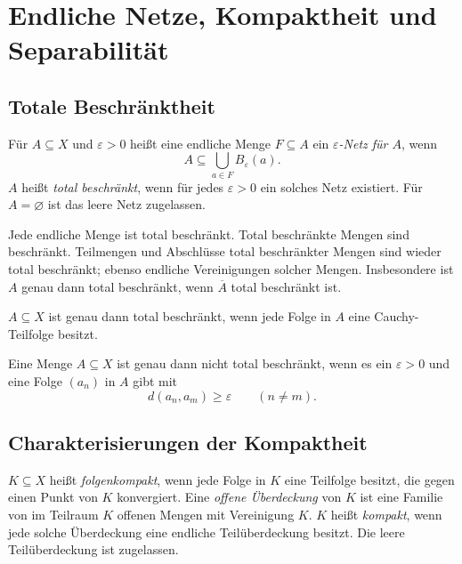 \chapter{Endliche Netze, Kompaktheit und Separabilität}
\label{b47guide:ch:compactness}

\section{Totale Beschränktheit}

\begin{definition}
\label{b47guide:def:totally-bounded}
Für $A\subseteq X$ und $\varepsilon>0$ heißt eine endliche Menge
$F\subseteq A$ ein \emph{$\varepsilon$-Netz für $A$}, wenn
\[
 A\subseteq\bigcup_{a\in F}B_\varepsilon(a).
\]
$A$ heißt \emph{total beschränkt}, wenn für jedes $\varepsilon>0$ ein
solches Netz existiert. Für $A=\varnothing$ ist das leere Netz zugelassen.
\end{definition}

\begin{theorem}
Jede endliche Menge ist total beschränkt. Total beschränkte Mengen sind
beschränkt. Teilmengen und Abschlüsse total beschränkter Mengen sind
wieder total beschränkt; ebenso endliche Vereinigungen solcher Mengen.
Insbesondere ist $A$ genau dann total beschränkt, wenn $\overline A$
total beschränkt ist.
\end{theorem}

\begin{theorem}
\label{b47guide:thm:tb-cauchy}
$A\subseteq X$ ist genau dann total beschränkt, wenn jede Folge in $A$
eine Cauchy-Teilfolge besitzt. \cite{project,baire-notes}
\end{theorem}

\begin{theorem}
Eine Menge $A\subseteq X$ ist genau dann nicht total beschränkt, wenn es
ein $\varepsilon>0$ und eine Folge $(a_n)$ in $A$ gibt mit
\[
 d(a_n,a_m)\geq\varepsilon\qquad(n\ne m).
\]
\end{theorem}

\section{Charakterisierungen der Kompaktheit}

\begin{definition}
\label{b47guide:def:compact}
$K\subseteq X$ heißt \emph{folgenkompakt}, wenn jede Folge in $K$ eine
Teilfolge besitzt, die gegen einen Punkt von $K$ konvergiert.
Eine \emph{offene Überdeckung} von $K$ ist eine Familie von im Teilraum
$K$ offenen Mengen mit Vereinigung $K$. $K$ heißt \emph{kompakt}, wenn
jede solche Überdeckung eine endliche Teilüberdeckung besitzt.
Die leere Teilüberdeckung ist zugelassen.
\end{definition}

